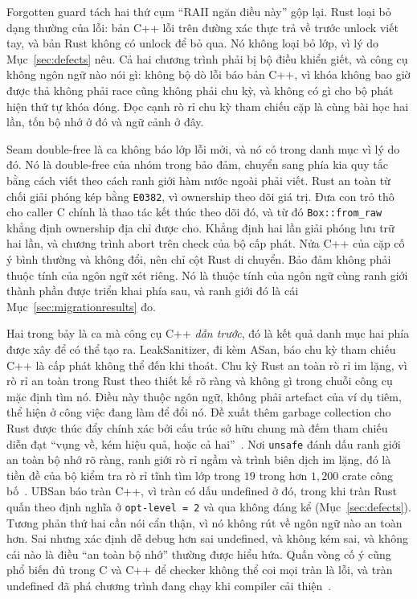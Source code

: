 Forgotten guard tách hai thứ cụm ``RAII ngăn điều này'' gộp lại. Rust
loại bỏ dạng thường của lỗi: bản C++ lỗi trên đường xác thực trả về
trước unlock viết tay, và bản Rust không có unlock để bỏ qua. Nó không loại bỏ
lớp, vì lý do Mục~\ref{sec:defects} nêu. Cả hai chương trình phải bị bộ điều khiển giết,
và công cụ không ngôn ngữ nào nói gì: không bộ dò lỗi báo bản C++,
vì khóa không bao giờ được thả không phải race cũng không phải chu kỳ, và không có gì cho
bộ phát hiện thứ tự khóa đóng. Đọc cạnh rò rỉ chu kỳ tham chiếu cặp là cùng bài học
hai lần, tốn bộ nhớ ở đó và ngữ cảnh ở đây.

Seam double-free là ca không báo lớp lỗi mới, và nó có trong
danh mục vì lý do đó. Nó là double-free của nhóm trong bảo đảm, chuyển sang
phía kia quy tắc bằng cách viết theo cách ranh giới hàm nước ngoài phải viết.
Rust an toàn từ chối giải phóng kép bằng \texttt{E0382}, vì ownership theo dõi giá trị.
Đưa con trỏ thô cho caller C chính là thao tác kết thúc theo dõi đó, và từ
đó \texttt{Box::from\_raw} khẳng định ownership địa chỉ được cho. Khẳng định hai lần giải phóng lưu trữ hai lần, và chương trình abort trên check của bộ cấp phát. Nửa C++
của cặp cố ý bình thường và không đổi, nên chỉ cột
Rust di chuyển. Bảo đảm không phải thuộc tính của ngôn ngữ xét riêng. Nó là thuộc tính của
ngôn ngữ cùng ranh giới thành phần được triển khai phía sau, và ranh giới đó là
cái Mục~\ref{sec:migrationresults} đo.

Hai trong bảy là ca mà công cụ C++ \emph{dẫn trước}, đó là kết quả
danh mục hai phía được xây để có thể tạo ra. LeakSanitizer, đi kèm ASan,
báo chu kỳ tham chiếu C++ là cấp phát không thể đến khi thoát. Chu kỳ Rust an toàn
rò rỉ im lặng, vì rò rỉ an toàn trong Rust theo thiết kế rõ ràng và không gì trong chuỗi công cụ
mặc định tìm nó. Điều này thuộc ngôn ngữ, không phải artefact của
ví dụ tiêm, thể hiện ở công việc đang làm để đổi nó. Đề xuất thêm garbage
collection cho Rust được thúc đẩy chính xác bởi cấu trúc sở hữu chung mà đếm tham chiếu
diễn đạt ``vụng về, kém hiệu quả, hoặc cả hai''~\cite{hughes2025gcrust}. Nơi \texttt{unsafe}
đánh dấu ranh giới an toàn bộ nhớ rõ ràng, ranh giới rò rỉ ngầm và trình biên dịch
im lặng, đó là tiền đề của bộ kiểm tra rò rỉ tĩnh tìm lớp trong $19$ trong hơn
$1{,}200$ crate công bố~\cite{cui2024rcanary}. UBSan báo tràn C++, vì tràn có dấu undefined ở đó,
trong khi tràn Rust quấn theo định nghĩa ở
\texttt{opt-level~=~2} và qua không đáng kể (Mục~\ref{sec:defects}). Tương phản thứ hai
cần nói cẩn thận, vì nó không rút về ngôn ngữ nào an toàn hơn. Sai nhưng xác định dễ debug hơn sai undefined, và không kém sai, và
không cái nào là điều ``an toàn bộ nhớ'' thường được hiểu hứa. Quấn vòng cố ý cũng phổ biến
đủ trong C và C++ để checker không thể coi mọi tràn là lỗi, và tràn undefined
đã phá chương trình đang chạy khi compiler cải thiện~\cite{dietz2015overflow}.

